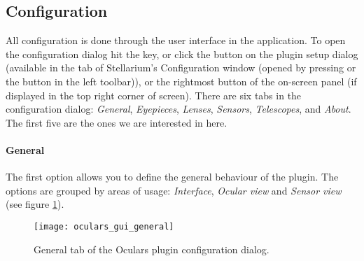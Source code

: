 \subsection{Configuration}
\label{sec:sec:plugins:Oculars:Configuration}
All configuration is done through the user interface in the application. 
To open the configuration dialog hit the  key, 
or click the  button on the plugin setup dialog (available in the
 tab of Stellarium's Configuration window (opened by 
pressing  or the  button in the left toolbar)), 
or the rightmost button of the on-screen panel (if displayed in the top right corner of screen). 
There are six tabs in the configuration dialog: \emph{General}, \emph{Eyepieces}, \emph{Lenses}, \emph{Sensors}, \emph{Telescopes}, and \emph{About}. The first five are the ones we are interested in here.

\paragraph{General}

The first option allows you to define the general behaviour of the plugin. 
The options are grouped by areas of usage: \emph{Interface}, \emph{Ocular view} and \emph{Sensor view} (see figure \ref{fig:plugins:Oculars:Gui:General}).

\begin{figure}[ht]\centering
\texttt{[image: oculars\_gui\_general]}
\caption{General tab of the Oculars plugin configuration dialog.}
\label{fig:plugins:Oculars:Gui:General}
\end{figure}

